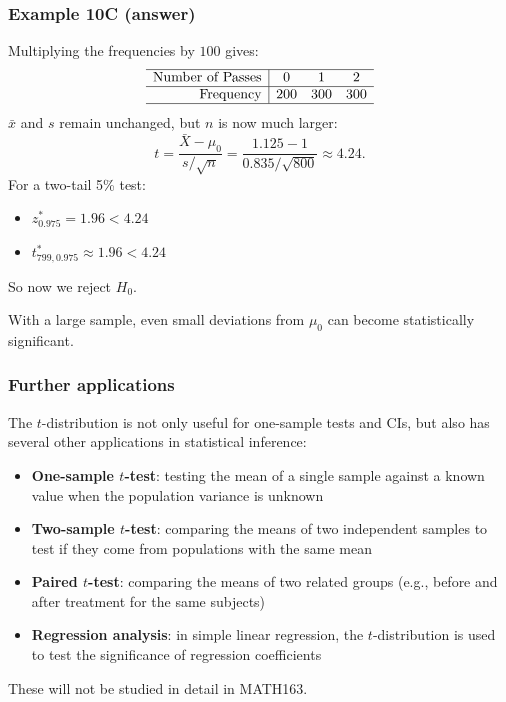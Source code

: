 \documentclass[t,8pt]{beamer}
\begin{document}
\begin{frame}
	\frametitle{Example 10C (answer)}
	Multiplying the frequencies by $100$ gives:
	\[
	\begin{array}{r|ccc}
		\hline
		\text{Number of Passes} & 0 & 1 & 2 \\
		\hline
		\text{Frequency} & 200 & 300 & 300 \\
		\hline
	\end{array}
	\]
	$\bar x$ and $s$ remain unchanged, but $n$ is now much larger:
	$$t=\frac{\bar{X} - \mu_0}{s / \sqrt{n}} = \frac{1.125 - 1}{0.835 / \sqrt{800}} \approx 4.24.$$
	For a two-tail 5\% test:
	\begin{itemize}
		\item $z^*_{0.975}=1.96<4.24$
		\item $t^*_{799,0.975}\approx 1.96<4.24$
	\end{itemize}
	So now we reject $H_0$. \par
	{\small\color{NavyBlue} With a large sample, even small deviations from $\mu_0$ can become statistically significant.}
\end{frame}

\begin{frame}
	\frametitle{Further applications}
	The $t$-distribution is not only useful for one-sample tests and CIs, but also has several other applications in statistical inference: \par
	\begin{itemize}
		\item \textbf{One-sample $t$-test}: testing the mean of a single sample against a known value when the population variance is unknown
		\item \textbf{Two-sample $t$-test}: comparing the means of two independent samples to test if they come from populations with the same mean
		\item \textbf{Paired $t$-test}: comparing the means of two related groups (e.g., before and after treatment for the same subjects)
		\item \textbf{Regression analysis}: in simple linear regression, the $t$-distribution is used to test the significance of regression coefficients
	\end{itemize}
	These will not be studied in detail in MATH163.
\end{frame}
\end{document}
